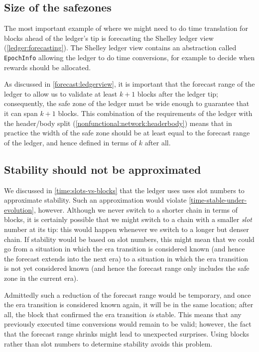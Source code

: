 \subsection{Size of the safezones}
\label{time:ledgerrestrictions:safezones}

The most important example of where we might need to do time translation for
blocks ahead of the ledger's tip is forecasting the Shelley ledger view
(\cref{ledger:forecasting}). The Shelley ledger view contains an abstraction
called \lstinline!EpochInfo! allowing the ledger to do time conversions, for
example to decide when rewards should be allocated.

As discussed in \cref{forecast:ledgerview}, it is important that the forecast
range of the ledger to allow us to validate at least $k + 1$ blocks after the
ledger tip; consequently, the safe zone of the ledger must be wide enough to
guarantee that it can span $k + 1$ blocks. This combination of the requirements
of the ledger with the header/body split
(\cref{nonfunctional:network:headerbody}) means that in practice the width of
the safe zone should be at least equal to the forecast range of the ledger, and
hence defined in terms of $k$ after all.

\subsection{Stability should not be approximated}

We discussed in \cref{time:slots-vs-blocks} that the ledger uses uses slot
numbers to approximate stability. Such an approximation would violate
\cref{time-stable-under-evolution}, however. Although we never switch to a
shorter chain in terms of blocks, it is certainly possible that we might switch
to a chain with a smaller \emph{slot} number at its tip: this would happen
whenever we switch to a longer but denser chain. If stability would be based on
slot numbers, this might mean that we could go from a situation in which the era
transition is considered known (and hence the forecast extends into the next
era) to a situation in which the era transition is not yet considered known (and
hence the forecast range only includes the safe zone in the current era).

Admittedly such a reduction of the forecast range would be temporary, and once
the era transition is considered known again, it will be in the same location;
after all, the block that confirmed the era transition \emph{is} stable. This
means that any previously executed time conversions would remain to be valid;
however, the fact that the forecast range shrinks might lead to unexpected
surprises. Using blocks rather than slot numbers to determine stability avoids
this problem.

